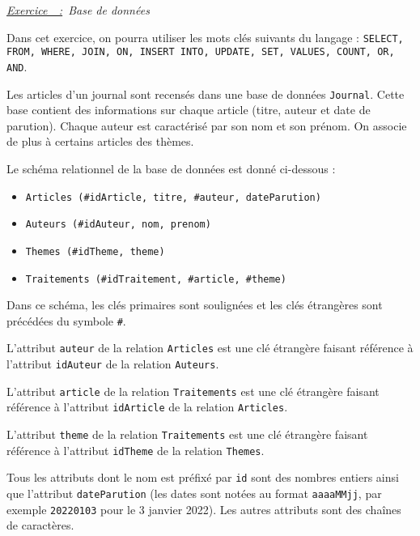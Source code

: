 \documentclass[a4paper, 11pt]{article}
\newcounter{exercice}
\newenvironment{Exercice}[1][]{
    \refstepcounter{exercice}
    \par
    \noindent
    {\large
    \underline{\textit{Exercice~\theexercice~:}}~#1}
    \par}
    {\vspace{1em}}
\begin{document}
\begin{Exercice}[\textit{Base de données}]

  Dans cet exercice, on pourra utiliser les mots clés suivants du langage  : \texttt{SELECT, FROM, WHERE, JOIN, ON, INSERT INTO, UPDATE,
 SET, VALUES, COUNT, OR, AND}.

  Les articles d'un journal sont recensés dans une base de données \texttt{Journal}. Cette base contient des informations sur chaque article (titre,
  auteur et date de parution). Chaque auteur est caractérisé par son nom et son prénom. On associe de plus à certains articles des thèmes.

  Le schéma relationnel de la base de données est donné ci-dessous :
  \begin{itemize}
    \item \texttt{Articles (#idArticle, titre, #auteur, dateParution)}
    \item \texttt{Auteurs (#idAuteur, nom, prenom)}
    \item \texttt{Themes (#idTheme, theme)}
    \item \texttt{Traitements (#idTraitement, #article, #theme)}
  \end{itemize}

  Dans ce schéma, les clés primaires sont soulignées et les clés étrangères sont précédées du symbole \texttt{#}.

  L'attribut \texttt{auteur} de la relation \texttt{Articles} est une clé étrangère faisant référence
  à l'attribut \texttt{idAuteur} de la relation \texttt{Auteurs}.

  L'attribut \texttt{article} de la relation \texttt{Traitements} est une clé étrangère faisant référence
  à l'attribut \texttt{idArticle} de la relation \texttt{Articles}.

  L'attribut \texttt{theme} de la relation \texttt{Traitements} est une clé étrangère faisant référence
  à l'attribut \texttt{idTheme} de la relation \texttt{Themes}.

  Tous les attributs dont le nom est préfixé par \texttt{id} sont des nombres entiers ainsi que l'attribut \texttt{dateParution} (les dates
  sont notées au format \texttt{aaaaMMjj}, par exemple \texttt{20220103} pour le 3 janvier 2022). Les autres attributs sont des chaînes de caractères.


\end{Exercice}
\end{document}
